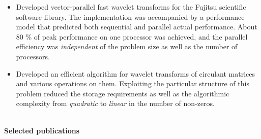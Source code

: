 \documentclass[11pt,a4paper]{article}
\begin{document}
\begin{itemize}
  \item Developed vector-parallel fast wavelet transforms
  for the Fujitsu scientific software library.
  The implementation was accompanied by a performance model that
  predicted both sequential and parallel actual performance.
  About 80 \% of peak performance on one processor was achieved,
  and the parallel efficiency was {\em independent} of the problem size
  as well as the number of processors.
  \item Developed an efficient algorithm for
  wavelet transforms of circulant matrices
  and various operations on them.
  Exploiting the particular structure of this problem
  reduced the storage requirements as well as the algorithmic complexity
  from {\em quadratic} to {\em linear} in the number of non-zeros.
\end{itemize}


\begin{center}
  \hrulefill \\
  {\bf Selected publications} \\[-0.2cm]
  \hrulefill
\end{center}


\end{document}
